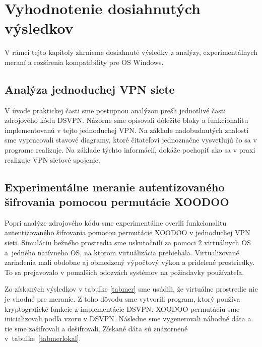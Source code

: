 \chapter{Vyhodnotenie dosiahnutých výsledkov}
V rámci tejto kapitoly zhrnieme dosiahnuté výsledky z analýzy, experimentálnych meraní a rozšírenia kompatibility pre OS Windows.
\section{Analýza jednoduchej VPN siete}
V úvode praktickej časti sme postupnou analýzou prešli jednotlivé časti zdrojového kódu DSVPN. Názorne sme opisovali dôležité bloky a funkcionalitu implementovanú v tejto jednoduchej VPN. Na základe nadobudnutých znalostí sme vypracovali stavové diagramy, ktoré čitateľovi jednoznačne vysvetľujú čo sa v programe realizuje. Na základe týchto informácií, dokáže pochopiť ako sa v praxi realizuje VPN sieťové spojenie.
\section{Experimentálne meranie autentizovaného šifrovania pomocou permutácie XOODOO}
Popri analýze zdrojového kódu sme experimentálne overili funkcionalitu autentizovaného šifrovania pomocou permutácie XOODOO v jednoduchej VPN sieti.  Simuláciu bežného prostredia sme uskutočnili za pomoci 2 virtuálnych OS a~jedného natívneho OS, na ktorom virtuálizácia prebiehala. Virtualizované zariadenia mali obdobne aj obmedzený výpočtový výkon a pridelené prostriedky. To sa prejavovalo v pomalších odozvách systémov na požiadavky používateľa. 

Zo získaných výsledkov v tabuľke \ref{tabmer} sme usúdili, že virtuálne prostredie nie je vhodné pre meranie. Z toho dôvodu sme vytvorili program, ktorý používa kryptografické funkcie z implementácie DSVPN. XOODOO permutáciu sme inicializovali podľa vzoru v DSVPN. Následne sme vygenerovali náhodné dáta a tie sme zašifrovali a dešifrovali. Získané dáta sú znázornené v~tabuľke~\ref{tabmerlokal}. 

